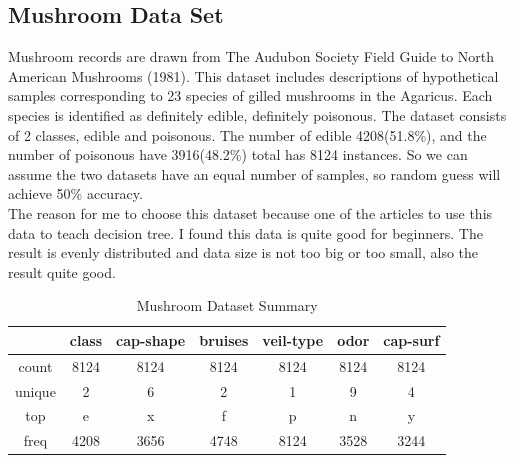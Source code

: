 \documentclass[10pt, conference, compsocconf]{IEEEtran}
\begin{document}
\subsection[]{Mushroom Data Set}
Mushroom records are drawn from The Audubon Society Field Guide to North
American Mushrooms (1981). This dataset includes descriptions of hypothetical samples
corresponding to 23 species of gilled mushrooms in the Agaricus. Each species is identified as definitely edible, definitely poisonous.
The dataset consists of 2 classes, edible and poisonous. The number of edible 4208(51.8\%), and the number of poisonous have 3916(48.2\%) total has 8124 instances. So we can assume the two datasets have an equal number of samples, so random guess will achieve 50\% accuracy.\\
 The reason for me to choose this dataset because one of the articles to use this data to teach decision tree\cite{decisionTree}. I found this data is quite good for beginners. The result is evenly distributed and data size is not too big or too small, also the result quite good. 
\begin{table}[h]
	\centering
	\caption{Mushroom Dataset Summary}
	\label{tab:2}
\begin{tabular}{|c|c|c|c|c|c|c|}
	\hline
	         & class & cap-shape & bruises & veil-type & odor & cap-surf    \\ \hline
	count    & 8124  & 8124      & 8124    & 8124      & 8124 & 8124        \\ \hline
	unique   & 2     & 6         & 2       & 1         & 9    & 4           \\ \hline
	top      & e     & x         & f       & p         & n    & y           \\ \hline
	freq     & 4208  & 3656      & 4748    & 8124      & 3528 & 3244        \\ \hline
\end{tabular}
\end{table}
\end{document}
